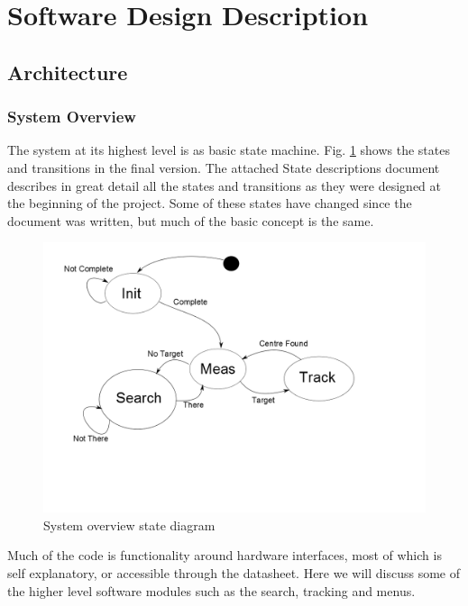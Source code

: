 \documentclass[]{report}
\begin{document}
\section{Software Design Description}
\subsection{Architecture}
\subsubsection{System Overview}
The system at its highest level is as basic state machine. Fig. \ref{fig:OperationStateTransitionDiagram} shows the states and transitions in the final version. The attached State descriptions document describes in great detail all the states and transitions as they were designed at the beginning of the project. Some of these states have changed since the document was written, but much of the basic concept is the same.

\begin{figure}
	\centering
	\includegraphics[width=0.7\linewidth]{"../Diagrams/Operation State Transition Diagram"}
	\caption[State Diagram]{System overview state diagram}
	\label{fig:OperationStateTransitionDiagram}
\end{figure}

Much of the code is functionality around hardware interfaces, most of which is self explanatory, or accessible through the datasheet. Here we will discuss some of the higher level software modules such as the search, tracking and menus.
\end{document}
